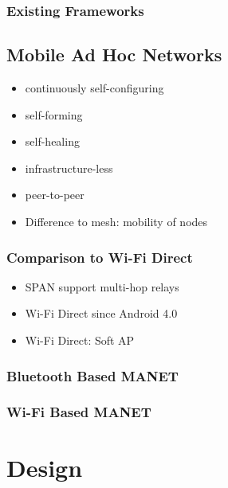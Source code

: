 		\subsection*{Existing Frameworks}
	
	\section{Mobile Ad Hoc Networks}
	
			{\color{gray} 
				\begin{itemize}  
					\item continuously self-configuring
					\item self-forming
					\item self-healing
					\item infrastructure-less
					\item peer-to-peer
					\item Difference to mesh: mobility of nodes
				\end{itemize}
			}
	
		
			\subsection*{Comparison to Wi-Fi Direct}
			
				{\color{gray} 
					\begin{itemize}  
						\item SPAN support multi-hop relays
						\item Wi-Fi Direct since Android 4.0
						\item Wi-Fi Direct: Soft AP 
					\end{itemize}
				}
		
			\subsection*{Bluetooth Based \gls{MANET} }

			\subsection*{Wi-Fi Based \gls{MANET}}
	
\chapter{Design }

